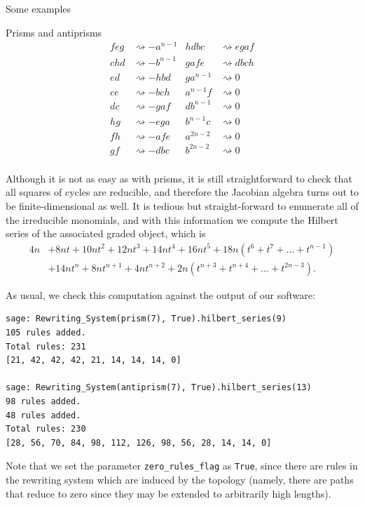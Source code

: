 \begin{chapter}{Some examples}
\begin{section}{Prisms and antiprisms}
\begin{align*}
feg &\rightsquigarrow -a^{n-1} 	& hdbc &\rightsquigarrow egaf \\
chd &\rightsquigarrow -b^{n-1}	& gafe &\rightsquigarrow dbch \\
ed &\rightsquigarrow -hbd		& ga^{n-1} &\rightsquigarrow 0 \\
ce &\rightsquigarrow -bch  	& a^{n-1}f &\rightsquigarrow 0 \\
dc &\rightsquigarrow -gaf 		& db^{n-1} &\rightsquigarrow 0 \\
hg &\rightsquigarrow -ega  	& b^{n-1}c &\rightsquigarrow 0 \\
fh &\rightsquigarrow -afe  	& a^{2n-2} &\rightsquigarrow 0 \\
gf &\rightsquigarrow -dbc  	& b^{2n-2} &\rightsquigarrow 0 \\
\end{align*}

Although it is not as easy as with prisms, it is still straightforward to check that all squares of cycles are reducible, and therefore the Jacobian algebra turns out to be finite-dimensional as well. It is tedious but straight-forward to enumerate all of the irreducible monomials, and with this information we compute the Hilbert series of the associated graded object, which is
\begin{align*}
4n&+8nt+10nt^2+12nt^3+14nt^4+16nt^5+18n(t^6+t^7+\dots+t^{n-1})\\
&+14nt^n+8nt^{n+1}+4nt^{n+2}+2n(t^{n+3}+t^{n+4}+\dots+t^{2n-3}).
\end{align*}

As usual, we check this computation against the output of our software:
\begin{lstlisting}
sage: Rewriting_System(prism(7), True).hilbert_series(9)
105 rules added.
Total rules: 231
[21, 42, 42, 42, 21, 14, 14, 14, 0]

sage: Rewriting_System(antiprism(7), True).hilbert_series(13)
98 rules added.
48 rules added.
Total rules: 230
[28, 56, 70, 84, 98, 112, 126, 98, 56, 28, 14, 14, 0]
\end{lstlisting}
Note that we set the parameter \texttt{zero\_rules\_flag} as \texttt{True}, since there are rules in the rewriting system which are induced by the topology (namely, there are paths that reduce to zero since they may be extended to arbitrarily high lengths).
\end{section}
\end{chapter}